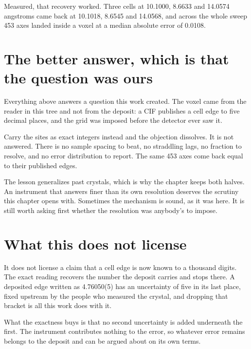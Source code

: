 Measured, that recovery worked. Three cells at 10.1000, 8.6633 and 14.0574 angstroms came back at 10.1018, 8.6545 and 14.0568, and across the whole sweep 453 axes landed inside a voxel at a median absolute error of 0.0108.

\section{The better answer, which is that the question was ours}

Everything above answers a question this work created. The voxel came from the reader in this tree and not from the deposit: a CIF publishes a cell edge to five decimal places, and the grid was imposed before the detector ever saw it.

Carry the sites as exact integers instead and the objection dissolves. It is not answered. There is no sample spacing to beat, no straddling lags, no fraction to resolve, and no error distribution to report. The same 453 axes come back equal to their published edges.

The lesson generalizes past crystals, which is why the chapter keeps both halves. An instrument that answers finer than its own resolution deserves the scrutiny this chapter opens with. Sometimes the mechanism is sound, as it was here. It is still worth asking first whether the resolution was anybody's to impose.

\section{What this does not license}

It does not license a claim that a cell edge is now known to a thousand digits. The exact reading recovers the number the deposit carries and stops there. A deposited edge written as 4.76050(5) has an uncertainty of five in its last place, fixed upstream by the people who measured the crystal, and dropping that bracket is all this work does with it.

What the exactness buys is that no second uncertainty is added underneath the first. The instrument contributes nothing to the error, so whatever error remains belongs to the deposit and can be argued about on its own terms.
